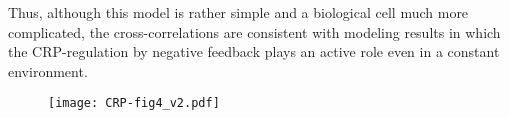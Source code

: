 Thus, although this model is rather simple and a biological cell much more complicated, %
the cross-correlations are consistent with modeling results 
in which the CRP-regulation by negative feedback plays an active role even in a constant environment.
%
%



%


\begingroup %
\begin{figure}	
	\centering	
	\texttt{[image: CRP-fig4\_v2.pdf]}	
	\clearpage %
\end{figure}	

\clearpage

